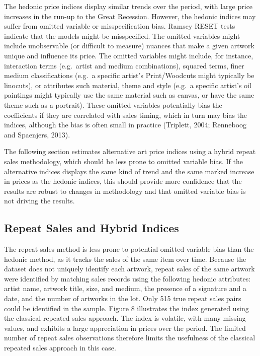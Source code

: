 \documentclass[12pt,]{article}
\begin{document}
The hedonic price indices display similar trends over the period, with
large price increases in the run-up to the Great Recession. However, the
hedonic indices may suffer from omitted variable or misspecification
bias. Ramsey RESET tests indicate that the models might be misspecified.
The omitted variables might include unobservable (or difficult to
measure) nuances that make a given artwork unique and influence its
price. The omitted variables might include, for instance, interaction
terms (e.g.~artist and medium combinations), squared terms, finer medium
classifications (e.g.~a specific artist's Print/Woodcuts might typically
be linocuts), or attributes such material, theme and style (e.g.~a
specific artist's oil paintings might typically use the same material
such as canvas, or have the same theme such as a portrait). These
omitted variables potentially bias the coefficients if they are
correlated with sales timing, which in turn may bias the indices,
although the bias is often small in practice (Triplett, 2004; Renneboog
and Spaenjers, 2013).

The following section estimates alternative art price indices using a
hybrid repeat sales methodology, which should be less prone to omitted
variable bias. If the alternative indices displays the same kind of
trend and the same marked increase in prices as the hedonic indices,
this should provide more confidence that the results are robust to
changes in methodology and that omitted variable bias is not driving the
results.

\subsection{Repeat Sales and Hybrid
Indices}\label{repeat-sales-and-hybrid-indices}

The repeat sales method is less prone to potential omitted variable bias
than the hedonic method, as it tracks the sales of the same item over
time. Because the dataset does not uniquely identify each artwork,
repeat sales of the same artwork were identified by matching sales
records using the following hedonic attributes: artist name, artwork
title, size, and medium, the presence of a signature and a date, and the
number of artworks in the lot. Only 515 true repeat sales pairs could be
identified in the sample. Figure 8 illustrates the index generated using
the classical repeated sales approach. The index is volatile, with many
missing values, and exhibits a large appreciation in prices over the
period. The limited number of repeat sales observations therefore limits
the usefulness of the classical repeated sales approach in this case.
\end{document}
